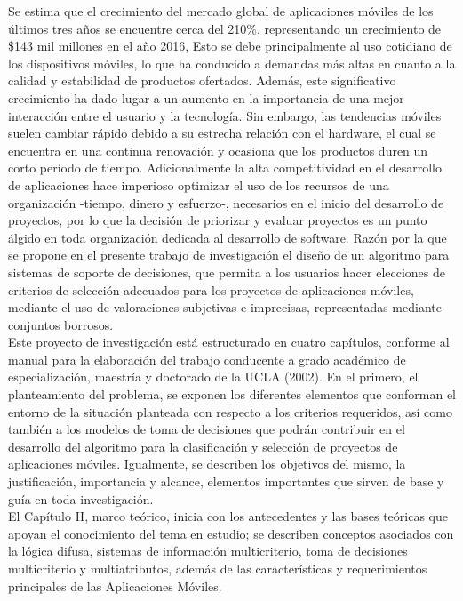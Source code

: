 \introduccion
Se estima que el crecimiento del mercado global de aplicaciones móviles de los últimos tres años se encuentre cerca del 210\%, representando un crecimiento de \$143 mil millones en el año 2016,  Esto se debe principalmente al uso cotidiano de los dispositivos móviles, lo que ha conducido a demandas más altas en cuanto a la calidad y estabilidad de productos ofertados. Además, este significativo crecimiento ha dado lugar a un aumento en la importancia de una mejor interacción entre el usuario y la tecnología. Sin embargo, las tendencias móviles suelen cambiar rápido debido a su estrecha relación con el hardware, el cual se encuentra en una continua renovación y ocasiona que los productos duren un corto período de tiempo. Adicionalmente la alta competitividad en el desarrollo de aplicaciones hace imperioso optimizar el uso de los recursos de una organización -tiempo, dinero y esfuerzo-, necesarios en el inicio del desarrollo de proyectos, por lo que la decisión de priorizar y evaluar proyectos es un punto álgido en toda organización dedicada al desarrollo de software. Razón por la que se propone en el presente trabajo de investigación el diseño de un algoritmo para sistemas de soporte de decisiones, que permita a los usuarios hacer elecciones de  criterios de selección adecuados para los proyectos de aplicaciones móviles, mediante el uso de valoraciones subjetivas e imprecisas, representadas mediante conjuntos borrosos.\\

Este proyecto de investigación está estructurado en cuatro capítulos, conforme al manual para la elaboración del trabajo conducente a grado académico de especialización, maestría y doctorado de la UCLA (2002). En el primero, el planteamiento del problema, se exponen los diferentes elementos que conforman el entorno de la situación planteada con respecto a los criterios requeridos, así como también a los modelos de toma de decisiones que podrán contribuir en el desarrollo del algoritmo para la clasificación y selección de proyectos de aplicaciones móviles. Igualmente, se describen los objetivos del mismo, la justificación,  importancia y alcance, elementos importantes que sirven de base y guía en toda investigación.\\

El Capítulo II, marco teórico, inicia con los antecedentes y las bases teóricas que apoyan el conocimiento del tema en estudio; se describen conceptos asociados con la lógica difusa, sistemas de información multicriterio, toma de decisiones multicriterio y multiatributos, además de las características y requerimientos principales de las Aplicaciones Móviles.\\

